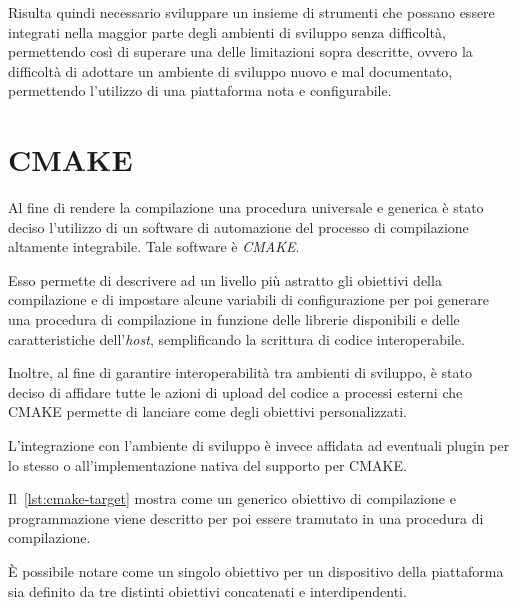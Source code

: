 Risulta quindi necessario sviluppare un insieme di strumenti che possano essere integrati nella maggior parte degli ambienti di sviluppo senza difficoltà, permettendo così di superare una delle limitazioni sopra descritte, ovvero la difficoltà di adottare un ambiente di sviluppo nuovo e mal documentato, permettendo l'utilizzo di una piattaforma nota e configurabile.

\section{CMAKE}\label{s:cmake}

Al fine di rendere la compilazione una procedura universale e generica è stato deciso l'utilizzo di un software di automazione del processo di compilazione altamente integrabile. Tale software è \textit{CMAKE}.

Esso permette di descrivere ad un livello più astratto gli obiettivi della compilazione e di impostare alcune variabili di configurazione per poi generare una procedura di compilazione in funzione delle librerie disponibili e delle caratteristiche dell'\textit{host}, semplificando la scrittura di codice interoperabile.

Inoltre, al fine di garantire interoperabilità tra ambienti di sviluppo, è stato deciso di affidare tutte le azioni di upload del codice a processi esterni che CMAKE permette di lanciare come degli obiettivi personalizzati.

L'integrazione con l'ambiente di sviluppo è invece affidata ad eventuali plugin per lo stesso o all'implementazione nativa del supporto per CMAKE.\@

Il~\cref{lst:cmake-target} mostra come un generico obiettivo di compilazione e programmazione viene descritto per poi essere tramutato in una procedura di compilazione.

È possibile notare come un singolo obiettivo per un dispositivo della piattaforma sia definito da tre distinti obiettivi concatenati e interdipendenti.

